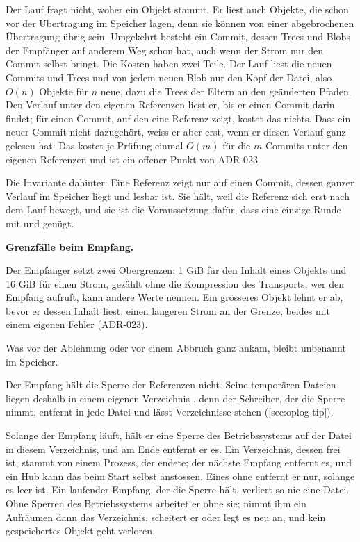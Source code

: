 Der Lauf fragt nicht, woher ein Objekt stammt.
Er liest auch Objekte, die schon vor der Übertragung im Speicher lagen, denn sie können von
einer abgebrochenen Übertragung übrig sein.
Umgekehrt besteht ein Commit, dessen Trees und Blobs der Empfänger auf anderem Weg schon hat,
auch wenn der Strom nur den Commit selbst bringt.
Die Kosten haben zwei Teile.
Der Lauf liest die neuen Commits und Trees und von jedem neuen Blob nur den Kopf der Datei,
also $O(n)$ Objekte für $n$ neue, dazu die Trees der Eltern an den geänderten Pfaden.
Den Verlauf unter den eigenen Referenzen liest er, bis er einen Commit darin findet; für einen
Commit, auf den eine Referenz zeigt, kostet das nichts.
Dass ein neuer Commit nicht dazugehört, weiss er aber erst, wenn er diesen Verlauf ganz gelesen
hat: Das kostet je Prüfung einmal $O(m)$ für die $m$ Commits unter den eigenen Referenzen und
ist ein offener Punkt von ADR-023.

Die Invariante dahinter: Eine Referenz zeigt nur auf einen Commit, dessen ganzer Verlauf im
Speicher liegt und lesbar ist.
Sie hält, weil die Referenz sich erst nach dem Lauf bewegt, und sie ist die Voraussetzung dafür,
dass eine einzige Runde mit  und  genügt.

\startinfobox
{\bf Grenzfälle beim Empfang.}
\startitemize
\item Der Empfänger setzt zwei Obergrenzen: 1 GiB für den Inhalt eines Objekts und 16 GiB für
einen Strom, gezählt ohne die Kompression des Transports; wer den Empfang aufruft, kann andere
Werte nennen.
Ein grösseres Objekt lehnt er ab, bevor er dessen Inhalt liest, einen längeren Strom an der
Grenze, beides mit einem eigenen Fehler (ADR-023).
\item Was vor der Ablehnung oder vor einem Abbruch ganz ankam, bleibt unbenannt im Speicher.
\item Der Empfang hält die Sperre der Referenzen nicht.
Seine temporären Dateien liegen deshalb in einem eigenen Verzeichnis
, denn der Schreiber, der die Sperre nimmt, entfernt in  jede
Datei und lässt Verzeichnisse stehen ([sec:oplog-tip]).
\item Solange der Empfang läuft, hält er eine Sperre des Betriebssystems auf der Datei
 in diesem Verzeichnis, und am Ende entfernt er es.
Ein Verzeichnis, dessen  frei ist, stammt von einem Prozess, der endete; der nächste
Empfang entfernt es, und ein Hub kann das beim Start selbst anstossen.
Eines ohne  entfernt er nur, solange es leer ist.
Ein laufender Empfang, der die Sperre hält, verliert so nie eine Datei.
Ohne Sperren des Betriebssystems arbeitet er ohne sie; nimmt ihm ein Aufräumen dann das
Verzeichnis, scheitert er oder legt es neu an, und kein gespeichertes Objekt geht verloren.
\stopitemize
\stopinfobox

